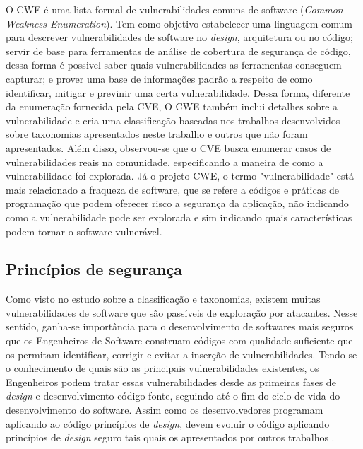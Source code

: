 %

O CWE é uma lista formal de vulnerabilidades comuns de software (\emph{Common Weakness Enumeration}). Tem como objetivo estabelecer uma linguagem comum para descrever vulnerabilidades de software no \emph{design}, arquitetura ou no código; servir de base para ferramentas de análise de cobertura de segurança de código, dessa forma é possivel saber quais vulnerabilidades as ferramentas conseguem capturar; e prover uma base de informações padrão a respeito de como identificar, mitigar e previnir uma certa vulnerabilidade. Dessa forma, diferente da enumeração fornecida pela CVE, O CWE também inclui detalhes sobre a vulnerabilidade e cria uma classificação baseadas nos trabalhos desenvolvidos sobre taxonomias apresentados neste trabalho e outros que não foram apresentados. Além disso, observou-se que o CVE busca enumerar casos de vulnerabilidades reais na comunidade, especificando a maneira de como a vulnerabilidade foi explorada. Já o projeto CWE, o termo "vulnerabilidade" está mais relacionado a fraqueza de software, que se refere a códigos e práticas de programação que podem oferecer risco a segurança da aplicação, não indicando como a vulnerabilidade pode ser explorada e sim indicando quais características podem tornar o software vulnerável.

%

\subsection{Princípios de segurança}
\label{sec-security-principles}

Como visto no estudo sobre a classificação e taxonomias, existem muitas vulnerabilidades de software que são passíveis de exploração por atacantes. Nesse sentido, ganha-se importância para o desenvolvimento de softwares mais seguros que os Engenheiros de Software construam códigos com qualidade suficiente que os permitam identificar, corrigir e evitar a inserção de vulnerabilidades. Tendo-se o conhecimento de quais são as principais vulnerabilidades existentes, os Engenheiros podem tratar essas vulnerabilidades desde as primeiras fases de \emph{design} e desenvolvimento código-fonte, seguindo até o fim do ciclo de vida do desenvolvimento do software. Assim como os desenvolvedores programam aplicando ao código princípios de \emph{design}, devem evoluir o código aplicando princípios de \emph{design} seguro tais quais os apresentados por outros trabalhos \cite{saltzer1975} \cite{bishop2003} \cite{mcgraw2002} \cite{a1lshammari2009}.

